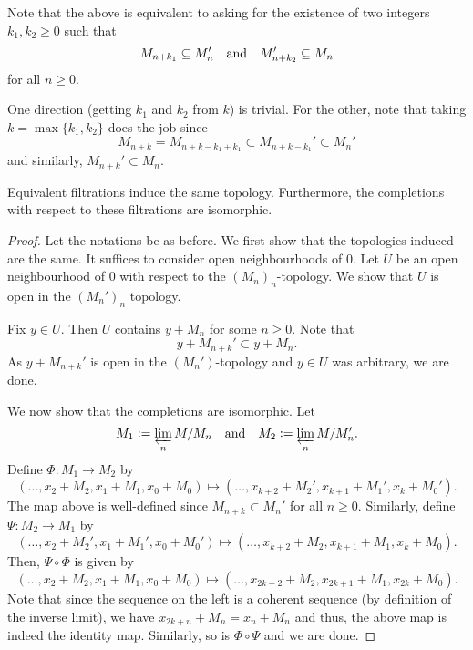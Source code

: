 Note that the above is equivalent to asking for the existence of two integers $k_{1}, k_{2} \ge 0$ such that
\begin{equation*} 
	M_{n + k_{1}} \subseteq M_{n}' \quad\text{and}\quad M_{n + k_{2}}' \subseteq M_{n}
\end{equation*}
for all $n \ge 0$.

One direction (getting $k_{1}$ and $k_{2}$ from $k$) is trivial. \newline
For the other, note that taking $k = \max\{k_{1}, k_{2}\}$ does the job since
\begin{equation*} 
	M_{n + k} = M_{n + k - k_{1} + k_{1}} \subset M_{n + k - k_{1}}' \subset M_{n}'
\end{equation*}
and similarly, $M_{n + k}' \subset M_{n}$.

\begin{prop}
	Equivalent filtrations induce the same topology. Furthermore, the completions with respect to these filtrations are isomorphic.
\end{prop}
\begin{proof} 
	Let the notations be as before. We first show that the topologies induced are the same. It suffices to consider open neighbourhoods of $0$. Let $U$ be an open neighbourhood of $0$ with respect to the $(M_{n})_{n}$-topology. We show that $U$ is open in the $(M_{n}')_{n}$ topology.

	Fix $y \in U$. Then $U$ contains $y + M_{n}$ for some $n \ge 0$. Note that
	\begin{equation*} 
		y + M_{n + k}' \subset y + M_{n}.
	\end{equation*}
	As $y + M_{n + k}'$ is open in the $(M_{n}')$-topology and $y \in U$ was arbitrary, we are done.

	We now show that the completions are isomorphic. Let
	\begin{equation*} 
		M_{1} \vcentcolon= \varprojlim_{n} M/M_{n} \quad\text{and}\quad M_{2} \vcentcolon= \varprojlim_{n} M/M_{n}'.
	\end{equation*}
	Define $\Phi : M_{1} \to M_{2}$ by
	\begin{equation*} 
		(\ldots, x_{2} + M_{2}, x_{1} + M_{1}, x_{0} + M_{0}) \mapsto (\ldots, x_{k + 2} + M_{2}', x_{k + 1} + M_{1}', x_{k} + M_{0}').
	\end{equation*}
	The map above is well-defined since $M_{n + k} \subset M_{n}'$ for all $n \ge 0$. Similarly, define $\Psi : M_{2} \to M_{1}$ by
	\begin{equation*} 
		(\ldots, x_{2} + M_{2}', x_{1} + M_{1}', x_{0} + M_{0}') \mapsto (\ldots, x_{k + 2} + M_{2}, x_{k + 1} + M_{1}, x_{k} + M_{0}).
	\end{equation*}
	Then, $\Psi \circ \Phi$ is given by
	\begin{equation*} 
		(\ldots, x_{2} + M_{2}, x_{1} + M_{1}, x_{0} + M_{0}) \mapsto (\ldots, x_{2k + 2} + M_{2}, x_{2k + 1} + M_{1}, x_{2k} + M_{0}).
	\end{equation*}
	Note that since the sequence on the left is a coherent sequence (by definition of the inverse limit), we have $x_{2k + n} + M_{n} = x_{n} + M_{n}$ and thus, the above map is indeed the identity map. Similarly, so is $\Phi \circ \Psi$ and we are done.
\end{proof}

